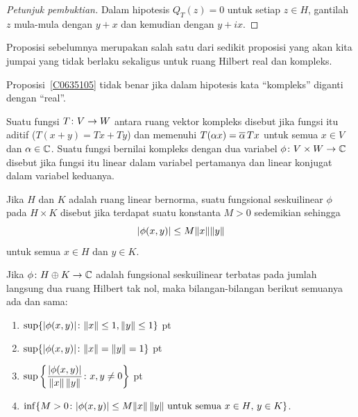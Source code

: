 \begin{proof}[\emph{Petunjuk pembuktian}] Dalam hipotesis $Q_T(z) = 0$ untuk setiap $z \in H$, gantilah $z$ mula-mula dengan $y + x$
dan kemudian dengan $y + ix$.  \ns
\end{proof}

Proposisi sebelumnya merupakan salah satu dari sedikit proposisi yang akan kita jumpai yang tidak berlaku sekaligus untuk ruang Hilbert real dan kompleks.

\begin{exam} Proposisi~\ref{C0635105} tidak benar jika dalam hipotesis kata ``kompleks'' diganti dengan ``real''.
\end{exam}

\begin{defn} Suatu fungsi $T\colon V \rightarrow W$ antara ruang vektor kompleks disebut
 jika fungsi itu aditif ($T(x+y) = Tx + Ty$) dan memenuhi $T(\alpha x) =
\overline{\alpha}\, Tx$ untuk semua $x \in V$ dan $\alpha \in \mathbb{C}$. Suatu fungsi bernilai kompleks dengan dua
variabel $\phi\colon V \times W \rightarrow \mathbb{C}$ disebut
 jika fungsi itu linear dalam variabel pertamanya dan linear konjugat
dalam variabel keduanya.

Jika $H$ dan $K$ adalah ruang linear bernorma, suatu fungsional seskuilinear $\phi$ pada $H \times K$
disebut
 jika terdapat suatu konstanta $M > 0$ sedemikian sehingga
    \[ \lvert\phi(x,y)\rvert \le M\lVert x\rVert\lVert y\rVert \]
untuk semua $x \in H$ dan $y \in K$.
\end{defn}

\begin{prop} Jika $\phi \colon H \oplus K \rightarrow \mathbb{C}$ adalah fungsional seskuilinear terbatas pada
jumlah langsung dua ruang Hilbert tak nol, maka bilangan-bilangan berikut semuanya ada dan sama:
 \begin{enumerate}[label=\rm{(\alph*)}]
    \item $\sup\{\lvert\phi(x,y)\rvert\colon \lVert x\rVert \le 1, \lVert y\rVert \le 1\}$
  pt
    \item $\sup\{\lvert\phi(x,y)\rvert\colon \lVert x\rVert = \lVert y\rVert = 1\}$
  pt
    \item $\sup\left\{\dfrac{\lvert\phi(x,y)\rvert}{\lVert x\rVert\,\lVert y\rVert}\colon x,y \ne 0\right\}$
  pt
    \item $\inf\{M > 0\colon \lvert\phi(x,y)\rvert \le M\lVert x\rVert\,\lVert y\rVert
                    \text{ untuk semua $x \in H$, $y \in K$}\}$.
 \end{enumerate}
\end{prop}


